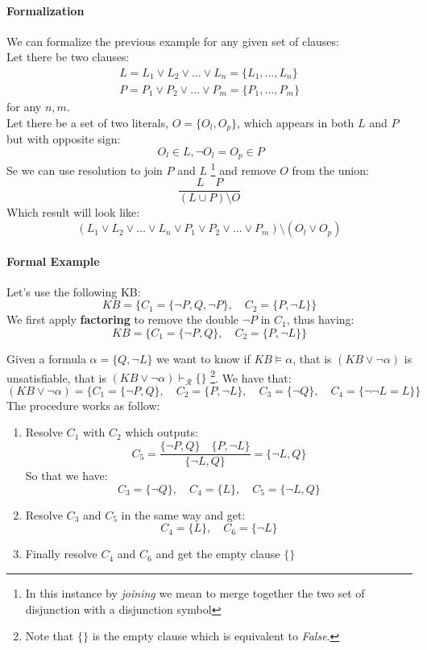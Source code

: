 \documentclass[10pt,a4paper]{article}
\begin{document}
\paragraph{Formalization}
We can formalize the previous example for any given set of clauses:\\
Let there be two clauses:
\begin{align}
L=L_1\vee L_2 \vee...\vee L_n=\lbrace L_1,...,L_n\rbrace\\ 
P=P_1\vee P_2 \vee...\vee P_m=\lbrace P_1,...,P_m\rbrace
\end{align}
for any $n,m$.\\
Let there be a set of two literals, $O=\lbrace O_l,O_p\rbrace$, which appears in both $L$ and $P$ but with opposite sign:
\[\ O_l \in L, \neg O_l=O_p \in P\]
Se we can use resolution to join $P$ and $L$ \footnote{In this instance by \textit{joining} we mean to merge together the two set of disjunction with a disjunction symbol} and remove $O$ from the union:
\[\frac{L\quad P}{(L\cup P)\setminus O}\]
Which result will look like:
\[(L_1\vee L_2 \vee...\vee L_n\vee P_1\vee P_2 \vee...\vee P_m)\setminus (O_l\vee O_p)  \]

\paragraph{Formal Example}
Let's use the following KB:
\[KB=\lbrace C_1=\lbrace\neg P,Q,\neg P\rbrace,\quad C_2=\lbrace P,\neg L\rbrace \rbrace\]
We first apply \textbf{factoring} to remove the double $\neg P$ in $C_1$, thus having:
\[KB=\lbrace C_1=\lbrace\neg P,Q\rbrace,\quad C_2=\lbrace P,\neg L\rbrace \rbrace\]

Given a formula $\alpha=\lbrace Q,\neg L\rbrace$ we want to know if $KB \models \alpha$, that is $(KB \vee \neg \alpha)$ is unsatisfiable, that is  $(KB \vee \neg \alpha) \vdash_{\mathcal{R}} \{\}$ \footnote{Note that $\{\}$ is the empty clause which is equivalent to \textit{False}.}. We have that:
\[(KB \vee \neg \alpha)=\lbrace C_1=\lbrace\neg P,Q\rbrace,\quad C_2=\lbrace P,\neg L\rbrace,\quad C_3=\lbrace \neg Q \rbrace,\quad C_4=\lbrace \neg \neg L=L\rbrace \rbrace\]
The procedure works as follow:
\begin{enumerate}
\item Resolve $C_1$ with $C_2$ which outputs:
\[C_5=\frac{\lbrace\neg P,Q\rbrace\quad \lbrace P,\neg L\rbrace}{\lbrace\neg L,Q\rbrace}=\lbrace\neg L,Q\rbrace\]
So that we have:
\[ C_3=\lbrace \neg Q \rbrace,\quad C_4=\lbrace L\rbrace ,\quad C_5=\lbrace\neg L,Q\rbrace \]
\item Resolve $C_3$ and $C_5$ in the same way and get:
\[C_4=\lbrace L\rbrace ,\quad C_6=\lbrace\neg L\rbrace \]
\item Finally resolve $C_4$ and $C_6$ and get the empty clause $\{\}$
\end{enumerate}
\end{document}
